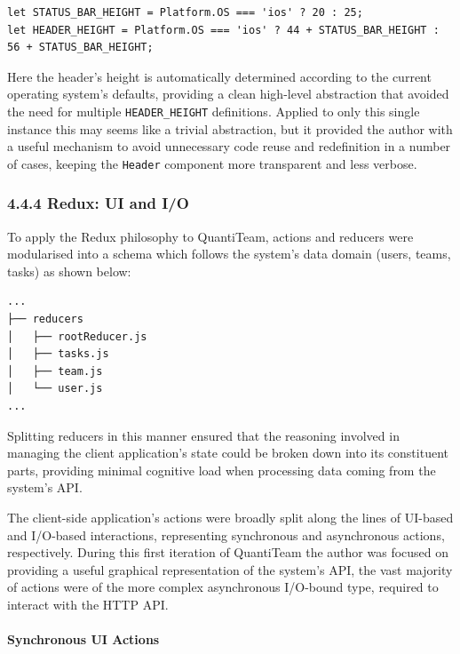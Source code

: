 \documentclass[12pt]{report}
\let\oldparagraph\paragraph
\renewcommand{\paragraph}[1]{\oldparagraph{#1}\mbox{}}
\begin{document}
\begin{verbatim}
let STATUS_BAR_HEIGHT = Platform.OS === 'ios' ? 20 : 25;
let HEADER_HEIGHT = Platform.OS === 'ios' ? 44 + STATUS_BAR_HEIGHT : 56 + STATUS_BAR_HEIGHT;
\end{verbatim}

Here the header's height is automatically determined according to the
current operating system's defaults, providing a clean high-level
abstraction that avoided the need for multiple \texttt{HEADER\_HEIGHT}
definitions. Applied to only this single instance this may seems like a
trivial abstraction, but it provided the author with a useful mechanism
to avoid unnecessary code reuse and redefinition in a number of cases,
keeping the \texttt{Header} component more transparent and less verbose.

\subsubsection{4.4.4 Redux: UI and I/O}\label{redux-ui-and-io}

To apply the Redux philosophy to QuantiTeam, actions and reducers were
modularised into a schema which follows the system's data domain (users,
teams, tasks) as shown below:

\begin{verbatim}
...
├── reducers
│   ├── rootReducer.js
│   ├── tasks.js
│   ├── team.js
│   └── user.js
...
\end{verbatim}

Splitting reducers in this manner ensured that the reasoning involved in
managing the client application's state could be broken down into its
constituent parts, providing minimal cognitive load when processing data
coming from the system's API.

The client-side application's actions were broadly split along the lines
of UI-based and I/O-based interactions, representing synchronous and
asynchronous actions, respectively. During this first iteration of
QuantiTeam the author was focused on providing a useful graphical
representation of the system's API, the vast majority of actions were of
the more complex asynchronous I/O-bound type, required to interact with
the HTTP API.

\paragraph{Synchronous UI Actions}\label{synchronous-ui-actions}
\end{document}
